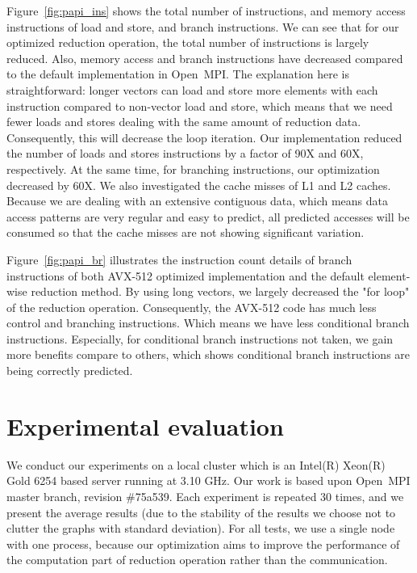 \documentclass[sigconf]{acmart}
\newcommand{\ompi}[0]{Open~MPI\xspace}
\begin{document}
Figure~\ref{fig:papi_ins} shows the total number of instructions, and memory access instructions of
load and store, and branch instructions.
We can see that for our optimized reduction operation, the total number of
instructions is largely reduced. Also, memory access and branch instructions
have decreased compared to the default implementation in \ompi.
The explanation here is straightforward: longer vectors can load and
store more elements with each instruction compared to non-vector load
and store, which means that we need fewer loads and stores dealing
with the same amount of reduction data.  Consequently, this will
decrease the loop iteration.
%
Our implementation reduced the number of loads and stores instructions
by a factor of 90X and 60X, respectively.  At the same time, for
branching instructions, our optimization decreased by 60X.  We also
investigated the cache misses of L1 and L2 caches. Because we are
dealing with an extensive contiguous data, which means data access
patterns are very regular and easy to predict, all predicted accesses
will be consumed so that the cache misses are not showing significant
variation.

Figure~\ref{fig:papi_br} illustrates the instruction count details
of branch instructions of both AVX-512 optimized implementation and the default
element-wise reduction method. By using long vectors, we largely decreased the "for loop" of the reduction
operation. Consequently, the AVX-512 code has much less control and branching instructions.
Which means we have less conditional branch instructions.
Especially, for conditional branch instructions not taken, we gain
more benefits compare to others, which shows conditional branch instructions are being correctly predicted.


\section{Experimental evaluation}\label{sec:experiments}
We conduct our experiments on a local cluster which is an Intel(R)
Xeon(R) Gold 6254 based server running at 3.10 GHz. Our work is based
upon \ompi master branch, revision \#75a539. Each experiment is
repeated 30 times, and we present the average results (due to the
stability of the results we choose not to clutter the graphs with
standard deviation). For all tests, we use a single node with one
process, because our optimization aims to improve the performance of
the computation part of reduction operation rather than the
communication.
\end{document}
